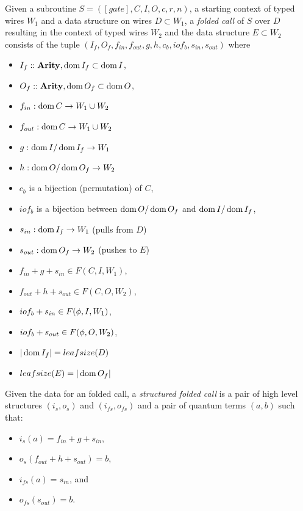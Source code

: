 \begin{definition}\label{def:subroutine_fold}
  Given a subroutine $S=([gate],C,I,O,c,r,n)$, a starting context of typed wires $W_1$ and a data
  structure on wires $D\subset W_1$, a \emph{folded call} of $S$ over $D$ resulting in the context
  of typed wires $W_2$ and the data structure $E\subset W_2$ consists of the tuple $(I_f,O_f,
  f_{in}, f_{out}, g, h, c_b, iof_b, s_{in}, s_{out} )$ where
  \begin{itemize}
    \item $I_f::\mathbf{{Arity}}, \operatorname*{dom}{I_f} \subset \operatorname*{dom}{I}$,
    \item $O_f::\mathbf{{Arity}}, \operatorname*{dom}{O_f} \subset \operatorname*{dom}{O}$,
    \item $f_{in}:\operatorname*{dom} C \to W_1\cup W_2$
    \item $f_{out}:\operatorname*{dom} C \to W_1\cup W_2$
    \item $g:\operatorname*{dom} I / \operatorname*{dom}{I_f} \to W_1$
    \item $h:\operatorname*{dom} O /\operatorname*{dom}{O_f} \to W_2$
    \item $c_b$ is a bijection (permutation) of $C$,
    \item $iof_b$ is a bijection between $\operatorname*{dom}{O}/\operatorname*{dom}{O_f}$ and $\operatorname*{dom}{I}/\operatorname*{dom}{I_f}$,
    \item $s_{in}: \operatorname*{dom}{I_f} \to W_1$ (pulls from $D$)
    \item $s_{out}: \operatorname*{dom}{O_f} \to W_2$ (pushes to $E$)
    \item $f_{in}+ g+ s_{in} \in F(C,I,W_1)$,
    \item $f_{out}+ h + s_{out} \in F(C,O,W_2)$,
    \item $iof_b + s_{in} \in F(\phi,I,W_1)$,
    \item $iof_b + s_{out} \in F(\phi,O,W_2)$,
    \item $|\operatorname*{dom}{I_f}| = leafsize(D)$
    \item $leafsize(E) = |\operatorname*{dom}{O_f}|$
  \end{itemize}

\end{definition}

\begin{definition}\label{def:structured_folded_call}
  Given the data for an folded call, a \emph{structured folded call} is a pair of high level
  structures $(i_s,o_s)$ and $(i_{fs},o_{fs})$ and a pair of quantum terms $(a,b)$ such that:
  \begin{itemize}
    \item $i_s(a) = f_{in}+g + s_{in}$,
    \item $o_s(f_{out} + h + s_{out}) = b$,
    \item $i_{fs}(a) = s_{in}$, and
    \item $o_{fs}(s_{out}) = b$.
  \end{itemize}
\end{definition}

